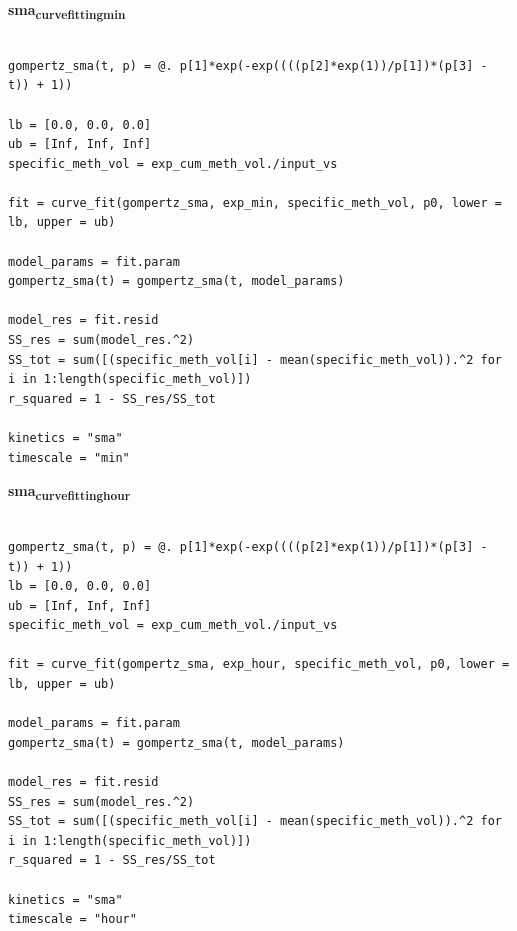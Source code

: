 \documentclass[11pt]{article}
\begin{document}
\textbf{sma\textsubscript{curve}\textsubscript{fitting}\textsubscript{min}}
\begin{verbatim}

gompertz_sma(t, p) = @. p[1]*exp(-exp((((p[2]*exp(1))/p[1])*(p[3] - t)) + 1))

lb = [0.0, 0.0, 0.0]
ub = [Inf, Inf, Inf]
specific_meth_vol = exp_cum_meth_vol./input_vs

fit = curve_fit(gompertz_sma, exp_min, specific_meth_vol, p0, lower = lb, upper = ub)

model_params = fit.param
gompertz_sma(t) = gompertz_sma(t, model_params)

model_res = fit.resid
SS_res = sum(model_res.^2)
SS_tot = sum([(specific_meth_vol[i] - mean(specific_meth_vol)).^2 for i in 1:length(specific_meth_vol)])
r_squared = 1 - SS_res/SS_tot

kinetics = "sma"
timescale = "min"
\end{verbatim}

\textbf{sma\textsubscript{curve}\textsubscript{fitting}\textsubscript{hour}}
\begin{verbatim}

gompertz_sma(t, p) = @. p[1]*exp(-exp((((p[2]*exp(1))/p[1])*(p[3] - t)) + 1))
lb = [0.0, 0.0, 0.0]
ub = [Inf, Inf, Inf]
specific_meth_vol = exp_cum_meth_vol./input_vs

fit = curve_fit(gompertz_sma, exp_hour, specific_meth_vol, p0, lower = lb, upper = ub)

model_params = fit.param
gompertz_sma(t) = gompertz_sma(t, model_params)

model_res = fit.resid
SS_res = sum(model_res.^2)
SS_tot = sum([(specific_meth_vol[i] - mean(specific_meth_vol)).^2 for i in 1:length(specific_meth_vol)])
r_squared = 1 - SS_res/SS_tot

kinetics = "sma"
timescale = "hour"
\end{verbatim}
\end{document}
